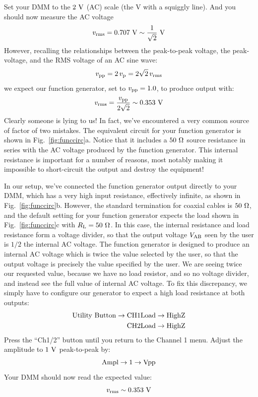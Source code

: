 Set your DMM to the $2~\rm V$ (AC) scale (the V with a squiggly line).
And you should now measure the AC voltage 
\begin{displaymath}
v_{\rm rms} = 0.707~\rm V \sim \frac{1}{\sqrt{2}}~\rm V
\end{displaymath}
However, recalling the relationships between the peak-to-peak voltage, the peak-voltage, and the RMS voltage of an AC sine wave:
\begin{displaymath}
v_{\rm pp} = 2 \, v_{\rm p} = 2 \sqrt{2} \, v_{\rm rms}
\end{displaymath}
we expect our function generator, set to $v_{\rm pp} = 1.0$, to produce output with:
\begin{displaymath}
v_{\rm rms} = \frac{v_{\rm pp}}{2\sqrt{2}} \sim 0.353~\rm V
\end{displaymath}
Clearly someone is lying to us!  In fact, we've encountered a very
common source of factor of two mistakes.  The equivalent circuit for
your function generator is shown in Fig.~\ref{fig:funccirc}a.  Notice
that it includes a $50~\rm \Omega$ source resistance in series with
the AC voltage produced by the function generator.  This internal
resistance is important for a number of reasons, most notably making
it impossible to short-circuit the output and destroy the
equipment!

In our setup, we've connected the function generator output directly
to your DMM, which has a very high input resistance, effectively
infinite, as shown in Fig.~\ref{fig:funccirc}b.  However, the standard
termination for coaxial cables is $50~\rm \Omega$, and the default
setting for your function generator expects the load shown in
Fig.~\ref{fig:funccirc}c with $R_{\rm L} = 50~\rm \Omega$.  In
this case, the internal resistance and load resistance form a voltage
divider, so that the output voltage $V_{\rm AB}$ seen by the user is
$1/2$ the internal AC voltage. The function generator is designed to
produce an internal AC voltage which is twice the value selected by
the user, so that the output voltage is precisely the value specified
by the user.  We are seeing twice our requested value, because we have
no load resistor, and so no voltage divider, and instead see the full
value of internal AC voltage.  To fix this discrepancy, we simply have
to configure our generator to expect a high load resistance at both
outputs:
\begin{eqnarray*}
{\rm Utility~Button \to CH1Load \to HighZ} \\
{\rm CH2Load \to HighZ}
\end{eqnarray*}
Press the ``Ch1/2'' button until you return to the Channel 1 menu.  Adjust the amplitude to $1~{\rm V}$ peak-to-peak by:
\begin{displaymath}
\rm Ampl \to 1 \to Vpp
\end{displaymath}
Your DMM should now read the expected value:
\begin{displaymath}
v_{\rm rms} \sim 0.353~\rm V
\end{displaymath}


